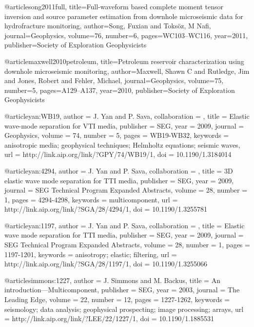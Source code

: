 @article{song2011full,
  title={Full-waveform based complete moment tensor inversion and source parameter estimation from downhole microseismic data for hydrofracture monitoring},
  author={Song, Fuxian and Toks{\"o}z, M Nafi},
  journal={Geophysics},
  volume={76},
  number={6},
  pages={WC103--WC116},
  year={2011},
  publisher={Society of Exploration Geophysicists}
}

@article{maxwell2010petroleum,
  title={Petroleum reservoir characterization using downhole microseismic monitoring},
  author={Maxwell, Shawn C and Rutledge, Jim and Jones, Robert and Fehler, Michael},
  journal={Geophysics},
  volume={75},
  number={5},
  pages={A129--A137},
  year={2010},
  publisher={Society of Exploration Geophysicists}
}








@article{yan:WB19,
author = {J. Yan and P. Sava},
collaboration = {},
title = {Elastic wave-mode separation for {VTI} media},
publisher = {SEG},
year = {2009},
journal = {Geophysics},
volume = {74},
number = {5},
pages = {WB19-WB32},
keywords = {anisotropic media; geophysical techniques; Helmholtz equations; seismic waves},
url = {http://link.aip.org/link/?GPY/74/WB19/1},
doi = {10.1190/1.3184014}
}




@article{yan:4294,
author = {J. Yan and P. Sava},
collaboration = {},
title = {3{D} elastic wave mode separation for {TTI} media},
publisher = {SEG},
year = {2009},
journal = {SEG Technical Program Expanded Abstracts},
volume = {28},
number = {1},
pages = {4294-4298},
keywords = {multicomponent},
url = {http://link.aip.org/link/?SGA/28/4294/1},
doi = {10.1190/1.3255781}
}







@article{yan:1197,
author = {J. Yan and P. Sava},
collaboration = {},
title = {Elastic wave mode separation for {TTI} media},
publisher = {SEG},
year = {2009},
journal = {SEG Technical Program Expanded Abstracts},
volume = {28},
number = {1},
pages = {1197-1201},
keywords = {anisotropy; elastic; filtering},
url = {http://link.aip.org/link/?SGA/28/1197/1},
doi = {10.1190/1.3255066}
}






@article{simmons:1227,
  author =	 {J. Simmons and M. Backus},
  title =	 {An introduction---{M}ulticomponent},
  publisher =	 {SEG},
  year =	 2003,
  journal =	 {The Leading Edge},
  volume =	 22,
  number =	 12,
  pages =	 {1227-1262},
  keywords =	 {seismology; data analysis; geophysical prospecting;
                  image processing; arrays},
  url =		 {http://link.aip.org/link/?LEE/22/1227/1},
  doi =		 {10.1190/1.1885531}
}

